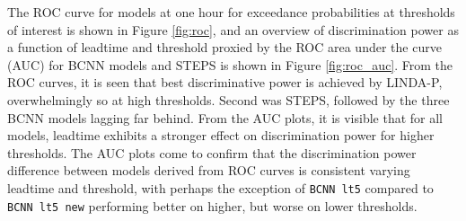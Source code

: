 The ROC curve for models at one hour for exceedance probabilities at thresholds of interest is shown in Figure \ref{fig:roc}, and an overview of discrimination power as a function of leadtime and threshold proxied by the ROC area under the curve (AUC) for BCNN models and STEPS is shown in Figure \ref{fig:roc_auc}. From the ROC curves, it is seen that best discriminative power is achieved by LINDA-P, overwhelmingly so at high thresholds. Second was STEPS, followed by the three BCNN models lagging far behind. From the AUC plots, it is visible that for all models, leadtime exhibits a stronger effect on discrimination power for higher thresholds. The AUC plots come to confirm that the discrimination power difference between models derived from ROC curves is consistent varying leadtime and threshold, with perhaps the exception of \texttt{BCNN lt5} compared to \texttt{BCNN lt5 new} performing better on higher, but worse on lower thresholds.


